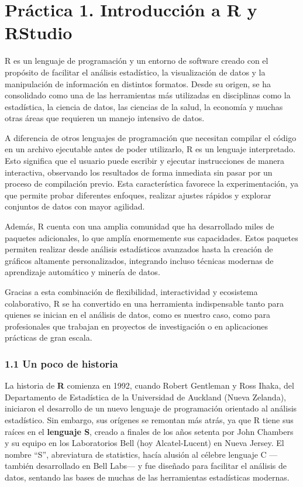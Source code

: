 \documentclass[
  letterpaper,
  DIV=11,
  numbers=noendperiod]{scrreprt}
\begin{document}
\hypertarget{pruxe1ctica-1.-introducciuxf3n-a-r-y-rstudio}{%
\chapter{\texorpdfstring{{Práctica 1. Introducción a R y
RStudio}}{Práctica 1. Introducción a R y RStudio}}\label{pruxe1ctica-1.-introducciuxf3n-a-r-y-rstudio}}

R es un lenguaje de programación y un entorno de software creado con el
propósito de facilitar el análisis estadístico, la visualización de
datos y la manipulación de información en distintos formatos. Desde su
origen, se ha consolidado como una de las herramientas más utilizadas en
disciplinas como la estadística, la ciencia de datos, las ciencias de la
salud, la economía y muchas otras áreas que requieren un manejo
intensivo de datos.

A diferencia de otros lenguajes de programación que necesitan compilar
el código en un archivo ejecutable antes de poder utilizarlo, R es un
lenguaje interpretado. Esto significa que el usuario puede escribir y
ejecutar instrucciones de manera interactiva, observando los resultados
de forma inmediata sin pasar por un proceso de compilación previo. Esta
característica favorece la experimentación, ya que permite probar
diferentes enfoques, realizar ajustes rápidos y explorar conjuntos de
datos con mayor agilidad.

Además, R cuenta con una amplia comunidad que ha desarrollado miles de
paquetes adicionales, lo que amplía enormemente sus capacidades. Estos
paquetes permiten realizar desde análisis estadísticos avanzados hasta
la creación de gráficos altamente personalizados, integrando incluso
técnicas modernas de aprendizaje automático y minería de datos.

Gracias a esta combinación de flexibilidad, interactividad y ecosistema
colaborativo, R se ha convertido en una herramienta indispensable tanto
para quienes se inician en el análisis de datos, como es nuestro caso,
como para profesionales que trabajan en proyectos de investigación o en
aplicaciones prácticas de gran escala.

\hypertarget{un-poco-de-historia}{%
\subsection{1.1 Un poco de historia}\label{un-poco-de-historia}}

La historia de \textbf{R} comienza en 1992, cuando Robert Gentleman y
Ross Ihaka, del Departamento de Estadística de la Universidad de
Auckland (Nueva Zelanda), iniciaron el desarrollo de un nuevo lenguaje
de programación orientado al análisis estadístico. Sin embargo, sus
orígenes se remontan más atrás, ya que R tiene sus raíces en el
\textbf{lenguaje S}, creado a finales de los años setenta por John
Chambers y su equipo en los Laboratorios Bell (hoy Alcatel-Lucent) en
Nueva Jersey. El nombre ``S'', abreviatura de statistics, hacía alusión
al célebre lenguaje C ---también desarrollado en Bell Labs--- y fue
diseñado para facilitar el análisis de datos, sentando las bases de
muchas de las herramientas estadísticas modernas.
\end{document}
